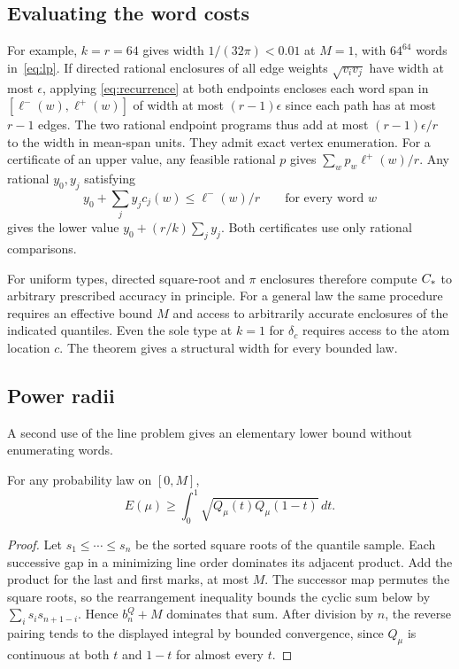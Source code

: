 \subsection{Evaluating the word costs}
For example, $k=r=64$ gives width $1/(32\pi)<0.01$ at $M=1$, with $64^{64}$
words in~\eqref{eq:lp}. If directed rational enclosures of all edge
weights $\sqrt{v_i v_j}$ have width at most $\epsilon$, applying
\eqref{eq:recurrence} at both endpoints encloses each word span in
$[\ell^-(w),\ell^+(w)]$ of width at most $(r-1)\epsilon$ since each path has
at most $r-1$ edges. The two rational endpoint programs thus add at most
$(r-1)\epsilon/r$ to the width in mean-span units. They admit exact
vertex enumeration. For a certificate of an upper value, any feasible rational $p$
gives $\sum_w p_w\ell^+(w)/r$. Any rational $y_0,y_j$
satisfying
\[
 y_0+\sum_j y_jc_j(w)\le\ell^-(w)/r\qquad\text{for every word }w
\]
gives the lower value $y_0+(r/k)\sum_j y_j$. Both certificates use
only rational comparisons.

For uniform types, directed square-root and $\pi$ enclosures therefore
compute $C_\ast$ to arbitrary prescribed accuracy in principle. For a
general law the same procedure requires an effective bound $M$ and
access to arbitrarily accurate enclosures of the indicated quantiles.
Even the sole type at $k=1$ for $\delta_c$ requires access to the atom location
$c$. The theorem gives a structural width for every bounded law.



\subsection{Power radii}
A second use of the line problem gives an elementary lower bound without
enumerating words.

\begin{corollary}\label{cor:profile-adjacent}
For any probability law on $[0,M]$,
\[
 E(\mu)\ge\int_0^1\sqrt{Q_\mu(t)Q_\mu(1-t)}\,dt .
\]
\end{corollary}
\begin{proof}
Let $s_1\le\cdots\le s_n$ be the sorted square roots of the quantile
sample. Each successive gap in a minimizing line order dominates its
adjacent product. Add the product for the last and first marks, at most
$M$. The successor map permutes the square roots, so the rearrangement
inequality bounds the cyclic sum below by $\sum_i s_i s_{n+1-i}$.
Hence $b_n^Q+M$ dominates that sum. After division by $n$, the reverse
pairing tends to the displayed integral by bounded convergence, since
$Q_\mu$ is continuous at both $t$ and $1-t$ for almost every $t$.
\end{proof}


